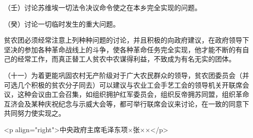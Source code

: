 （壬）讨论苏维埃一切法令决议命令使之在本乡完全实现的问题。

（癸）讨论一切临时发生的重大问题。

贫农团必须经常注意上列种种问题的讨论，并且积极的向政府建议，在政府领导下坚决的参加各种革命战线上的斗争，使各种革命任务完全实现，他才能不断的有自己的经常工作，而真正替工人贫农中农谋得利益，不致成为有名无实的团体。

（十一）为着更能巩固农村无产阶级对于广大农民群众的领导，贫农团委员会（并可选几个积极的贫农分子同去）可以建议与农业工会手艺工会的领导机关开联席会议，这种会议由工会召集，如组织拥护红军委员会，组织反帝拥苏同盟，组织革命互济会及某种庆祝纪念与示威大会等，都可举行联席会议来讨论，在一致的同意下共同努力使实现之。

<p align="right">中央政府主席毛泽东项×张××</p>

